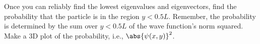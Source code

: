 \Question{} Once you can reliably find the lowest eigenvalues and eigenvectors, find the
probability that the particle is in the region \(y < 0.5L\). Remember, the probability is
determined by the sum over \(y < 0.5L\) of the wave function's norm squared. Make a 3D plot
of the probability, i.e., \(\abs{\psi(x, y)}^2\).
\newline
